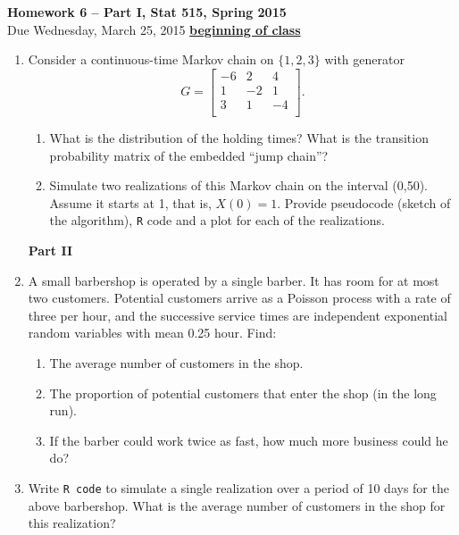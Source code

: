 \documentclass{article}
\begin{document}
\begin{center}
\Large
{\bf Homework 6 -- Part I, Stat 515, Spring 2015}\\
\normalsize
Due Wednesday, March 25, 2015 \underline{{\bf beginning of class}}\\
\end{center}

\begin{enumerate}
\item Consider a continuous-time Markov chain on $\{1,2,3 \}$ with generator
 \begin{equation*}
   G=
  \begin{bmatrix}
    -6 & 2 & 4 \\
    1 & -2 & 1\\
    3 & 1 & -4 \\
  \end{bmatrix}.
\end{equation*}
\begin{enumerate}
\item What is the distribution of the holding times? What is the transition probability matrix of the embedded ``jump chain''?
\item Simulate two realizations of this Markov chain on the interval
  (0,50). Assume it starts at 1, that is, $X(0)=1$. Provide pseudocode
  (sketch of the algorithm), {\tt R} code and a plot for each of the realizations.
  \end{enumerate}
{\bf Part II}
\item A small barbershop is operated by a single barber. It has room
  for at most two customers. Potential customers arrive as a Poisson
  process with a rate of three per hour, and the successive service times are
  independent exponential random variables with mean 0.25 hour. Find:
\begin{enumerate}
\item The average number of customers in the shop.
\item The proportion of potential customers that enter the shop (in
  the long run). 
\item If the barber could work twice as fast, how much more business
  could he do?
\end{enumerate}
\item Write {\tt R code} to simulate a single realization over a
  period of 10 days for the above barbershop. What is the average number of
  customers in the shop for this realization?

\end{enumerate}
\end{document}
